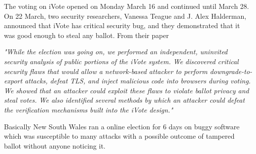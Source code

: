   \noindent
  The voting on iVote 
  opened on Monday March 16 and continued until March 28. On 22 March,
  two security researchers, Vanessa Teague and J. Alex Halderman, 
  announced that iVote has critical security bug, and they demonstrated 
  that it was good enough to steal any ballot. From their paper
  \citep{10.1007/978-3-319-22270-7_3}
  
  \textit{ 
  "While the election was going on, we performed an independent,
   uninvited security analysis of public portions of the iVote 
   system. We discovered critical security flaws that would allow
   a network-based attacker to perform downgrade-to-export 
   attacks, defeat TLS, and inject malicious code 
   into browsers during voting. We showed that an attacker could
   exploit these flaws to violate ballot privacy and steal votes. 
   We also identified several methods by which an attacker could
   defeat the verification mechanisms built into the iVote design." }
  
  \noindent
  Basically New South Wales ran a online election for 6 days on 
  buggy software which was susceptible to many attacks with a possible 
  outcome of tampered ballot without anyone noticing it. 
%  
%   
   
